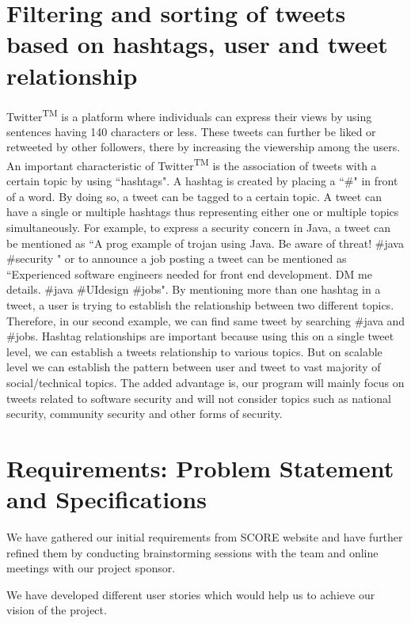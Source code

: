 \documentclass[11pt]{article}
\begin{document}
\section{Filtering and sorting of tweets based on hashtags, user and tweet relationship}

Twitter\textsuperscript{TM} is a platform where individuals can express their views by using sentences having 140 characters or less. These tweets can further be liked or retweeted by other followers, there by increasing the viewership among the users. An important characteristic of Twitter\textsuperscript{TM} is the association of tweets with a certain topic by using ``hashtags". A hashtag is created by placing a ``\#" in front of a word. By doing so, a tweet can be tagged to a certain topic. A tweet can have a single or multiple hashtags thus representing either one or multiple topics simultaneously. For example, to express a security concern in Java, a tweet can be mentioned as ``A prog example of trojan using Java. Be aware of threat! \#java \#security " or to announce a job posting a tweet can be mentioned as ``Experienced software engineers needed for front end development. DM me details. \#java \#UIdesign \#jobs". By mentioning more than one hashtag in a tweet, a user is trying to establish the relationship between two different topics. Therefore, in our second example, we can find same tweet by searching \#java and \#jobs. Hashtag relationships are important because using this on a single tweet level, we can establish a tweets relationship to various topics. But on scalable level we can establish the pattern between user and tweet to vast majority of social/technical topics. The added advantage is, our program will mainly focus on tweets related to software security and will not consider topics such as national security, community security and other forms of security.

\section{Requirements: Problem Statement and Specifications}
We have gathered our initial requirements from SCORE website\cite{SCOREwebsite} and have further refined them by conducting brainstorming sessions with the team and online meetings with our project sponsor.

We have developed different user stories which would help us to achieve our vision of the project. 
\end{document}
